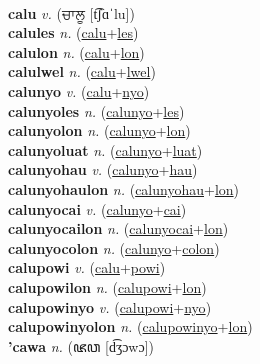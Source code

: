  \label{cayniki} \\
\textbf{calu} \textit{v.} ({\gurmukhi{}ਚਾਲੂ} [t͡ʃɑˈlu])
 \label{calu} \\
\textbf{calules} \textit{n.} (\hyperref[calu]{calu}+\hyperref[les]{les})
 \label{calules} \\
\textbf{calulon} \textit{n.} (\hyperref[calu]{calu}+\hyperref[lon]{lon})
 \label{calulon} \\
\textbf{calulwel} \textit{n.} (\hyperref[calu]{calu}+\hyperref[lwel]{lwel})
 \label{calulwel} \\
\textbf{calunyo} \textit{v.} (\hyperref[calu]{calu}+\hyperref[nyo]{nyo})
 \label{calunyo} \\
\textbf{calunyoles} \textit{n.} (\hyperref[calunyo]{calunyo}+\hyperref[les]{les})
 \label{calunyoles} \\
\textbf{calunyolon} \textit{n.} (\hyperref[calunyo]{calunyo}+\hyperref[lon]{lon})
 \label{calunyolon} \\
\textbf{calunyoluat} \textit{n.} (\hyperref[calunyo]{calunyo}+\hyperref[luat]{luat})
 \label{calunyoluat} \\
\textbf{calunyohau} \textit{v.} (\hyperref[calunyo]{calunyo}+\hyperref[hau]{hau})
 \label{calunyohau} \\
\textbf{calunyohaulon} \textit{n.} (\hyperref[calunyohau]{calunyohau}+\hyperref[lon]{lon})
 \label{calunyohaulon} \\
\textbf{calunyocai} \textit{v.} (\hyperref[calunyo]{calunyo}+\hyperref[cai]{cai})
 \label{calunyocai} \\
\textbf{calunyocailon} \textit{n.} (\hyperref[calunyocai]{calunyocai}+\hyperref[lon]{lon})
 \label{calunyocailon} \\
\textbf{calunyocolon} \textit{n.} (\hyperref[calunyo]{calunyo}+\hyperref[colon]{colon})
 \label{calunyocolon} \\
\textbf{calupowi} \textit{v.} (\hyperref[calu]{calu}+\hyperref[powi]{powi})
 \label{calupowi} \\
\textbf{calupowilon} \textit{n.} (\hyperref[calupowi]{calupowi}+\hyperref[lon]{lon})
 \label{calupowilon} \\
\textbf{calupowinyo} \textit{v.} (\hyperref[calupowi]{calupowi}+\hyperref[nyo]{nyo})
 \label{calupowinyo} \\
\textbf{calupowinyolon} \textit{n.} (\hyperref[calupowinyo]{calupowinyo}+\hyperref[lon]{lon})
 \label{calupowinyolon} \\
\textbf{'cawa} \textit{n.} ({\javanese{}ꦗꦮ} [d͡ʒɔwɔ])
 \label{'cawa} \\
